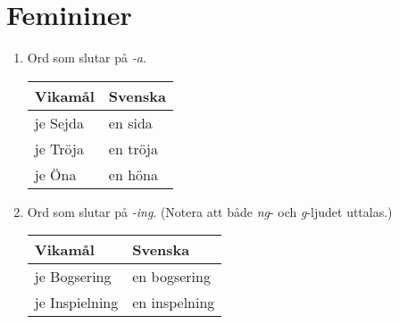\documentclass[a4paper]{memoir}
\newcommand{\eline}{\\[\baselineskip]} %
\newenvironment{mytable}[2]
{
  \eline
  \begin{tabular}{#1}
  \hline #2\\ \hline
}
{ \end{tabular} }
\newcommand{\myheader}[1]{ \hline #1\\ \hline }
\newenvironment{wlistvisv} %
{ \begin{mytable}{ l l }{Vikamål & Svenska} }
{ \end{mytable} }
\newenvironment{rlist} %
{ \begin{enumerate}[label=\Alph*] }
{ \end{enumerate} }
\begin{document}
    \section{Femininer}
      \begin{rlist}
        \item Ord som slutar på \emph{-a}.
        \begin{wlistvisv}
          je Sejda & en sida\\
          je Tröja & en tröja\\
          je Öna & en höna\\
        \end{wlistvisv}
        \item Ord som slutar på \emph{-ing}. (Notera att både \emph{ng}- och \emph{g}-ljudet uttalas.)
        \begin{wlistvisv}
          je Bogsering & en bogsering\\
          je Inspielning & en inspelning\\
        \end{wlistvisv}
      \end{rlist}
\end{document}
